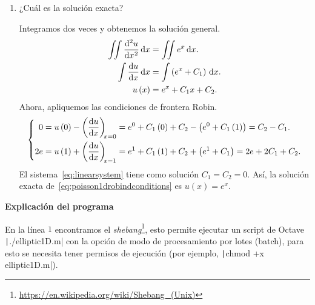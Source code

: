 \begin{problem}
\begin{enumerate}
    \item

          ¿Cuál es la solución exacta?

          \begin{solution}
              Integramos dos veces y obtenemos la solución general.
              \begin{align*}
                  \iint
                  \diff[2]{u}{x}
                  \dl x           & =
                  \iint
                  e^{x}
                  \dl x.              \\
                  \int
                  \diff{u}{x}
                  \dl x           & =
                  \int
                  \left(e^{x}+C_{1}\right)
                  \dl x.              \\
                  u\left(x\right) & =
                  e^{x}+C_{1}x+C_{2}.
              \end{align*}
              Ahora, apliquemos las condiciones de frontera Robin.
              \begin{equation}\label{eq:linearsystem}
                  \left\{
                  \begin{aligned}
                      0
                       & =
                      u\left(0\right)-
                      \diff{u}{x}[x=0]=
                      e^{0}+C_{1}\left(0\right)+C_{2}-
                      \left(e^{0}+C_{1}\left(1\right)\right)=
                      C_{2}-C_{1}. \\
                      2e
                       & =
                      u\left(1\right)+
                      \diff{u}{x}[x=1]=
                      e^{1}+C_{1}\left(1\right)+C_{2}+
                      \left(e^{1}+C_{1}\right)=
                      2e+2C_{1}+C_{2}.
                  \end{aligned}
                  \right.
              \end{equation}
              El sistema~\eqref{eq:linearsystem} tiene como solución
              $C_{1}=C_{2}=0$.
              Así, la solución exacta
              de~\eqref{eq:poisson1drobindconditions} es
              $u\left(x\right)=e^{x}$.
          \end{solution}
\end{enumerate}

\textsf{\bfseries Explicación del programa}

En la línea $1$ encontramos el
\emph{shebang}\footnote{\url{https://en.wikipedia.org/wiki/Shebang_(Unix)}},
esto permite ejecutar un script de Octave \texttt|./elliptic1D.m|
con la opción de modo de procesamiento por lotes (batch), para esto
se necesita tener permisos de ejecución (por ejemplo,
\texttt|chmod +x elliptic1D.m|).


\end{problem}
